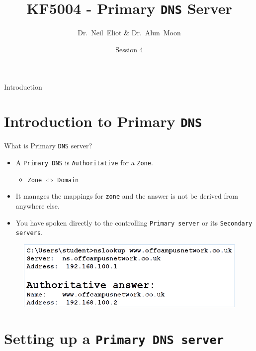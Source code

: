 \documentclass[xcolor=table]{beamer}
\title{KF5004 - Primary \texttt{DNS} Server}
\author{Dr.~Neil~Eliot \& Dr.~Alun~Moon}
\institute[Northumbria University] %
{
  Department of Computer and Information Sciences\\
  University of Northumbria
}
\date{Session 4}
\begin{document}
\begin{frame}
  \titlepage
\end{frame}

\begin{frame}{Introduction}
  \tableofcontents
\end{frame}


\section{Introduction to Primary \texttt{DNS}}
\begin{frame}{What is Primary \texttt{DNS} server?}
  \begin{itemize}
    \item A \texttt{Primary DNS} is \texttt{Authoritative} for a \texttt{Zone}.
      \begin{itemize}
          \item \texttt{Zone} $\Longleftrightarrow$ \texttt{Domain}
      \end{itemize}
    \item It manages the mappings for \texttt{zone} and the answer is not be derived from anywhere else.
    \item You have spoken directly to the controlling \texttt{Primary server} or its \texttt{Secondary servers}.
  \end{itemize}
  \begin{figure}
    \begin{center}
      \includegraphics[width=0.8\linewidth]{Authoritative.png}
    \end{center}
  \end{figure}
\end{frame}

\section{Setting up a \texttt{Primary DNS server}}
\end{document}
